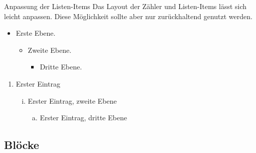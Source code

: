 \begin{frame}{Anpassung der Listen-Items}
Das Layout der Zähler und Listen-Items lässt sich leicht anpassen. Diese
Möglichkeit sollte aber nur zurückhaltend genutzt werden.


\begin{itemize}
   \item Erste Ebene.
       \begin{itemize}
        \item Zweite Ebene.
       \begin{itemize}
        \item Dritte Ebene.
       \end{itemize}
       \end{itemize}
\end{itemize}
\begin{enumerate}[1.]
  \item Erster Eintrag
  \begin{enumerate}[(i)]
  \item Erster Eintrag, zweite Ebene
  \begin{enumerate}[a)]
  \item Erster Eintrag, dritte Ebene
  \end{enumerate}
  \end{enumerate}
\end{enumerate}
\end{frame}

\subsection{Blöcke}

